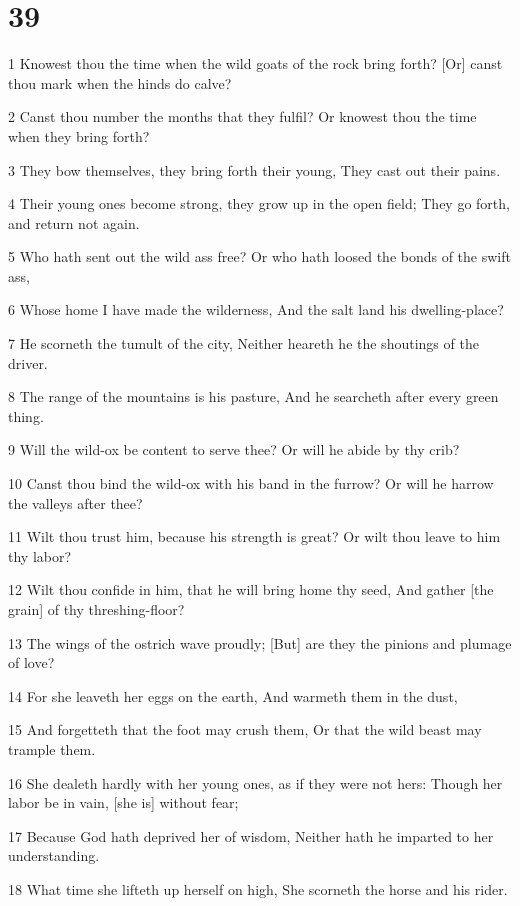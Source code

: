 \chapter{39}

\par 1 Knowest thou the time when the wild goats of the rock bring forth? [Or] canst thou mark when the hinds do calve?
\par 2 Canst thou number the months that they fulfil? Or knowest thou the time when they bring forth?
\par 3 They bow themselves, they bring forth their young, They cast out their pains.
\par 4 Their young ones become strong, they grow up in the open field; They go forth, and return not again.
\par 5 Who hath sent out the wild ass free? Or who hath loosed the bonds of the swift ass,
\par 6 Whose home I have made the wilderness, And the salt land his dwelling-place?
\par 7 He scorneth the tumult of the city, Neither heareth he the shoutings of the driver.
\par 8 The range of the mountains is his pasture, And he searcheth after every green thing.
\par 9 Will the wild-ox be content to serve thee? Or will he abide by thy crib?
\par 10 Canst thou bind the wild-ox with his band in the furrow? Or will he harrow the valleys after thee?
\par 11 Wilt thou trust him, because his strength is great? Or wilt thou leave to him thy labor?
\par 12 Wilt thou confide in him, that he will bring home thy seed, And gather [the grain] of thy threshing-floor?
\par 13 The wings of the ostrich wave proudly; [But] are they the pinions and plumage of love?
\par 14 For she leaveth her eggs on the earth, And warmeth them in the dust,
\par 15 And forgetteth that the foot may crush them, Or that the wild beast may trample them.
\par 16 She dealeth hardly with her young ones, as if they were not hers: Though her labor be in vain, [she is] without fear;
\par 17 Because God hath deprived her of wisdom, Neither hath he imparted to her understanding.
\par 18 What time she lifteth up herself on high, She scorneth the horse and his rider.
